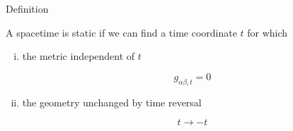 \documentclass{beamer}
\let\svthefootnote\thefootnote
\newcommand\blankfootnote[1]{%
  \let\thefootnote\relax\footnotetext{#1}%
  \let\thefootnote\svthefootnote%
}
\begin{document}
\begin{frame}{Definition}

A spacetime is static if we can find a time coordinate $t$ for which

\begin{enumerate}[(i)]
\item<+-> the metric independent of $t$

  \begin{displaymath}
    g_{\alpha\beta,t} = 0
  \end{displaymath}

\item<+-> the geometry unchanged by time reversal

  \begin{displaymath}
    t \to -t
  \end{displaymath}

\end{enumerate}

\blankfootnote{\textcite[p. 258]{Schutz}}


\end{frame}

\end{document}
